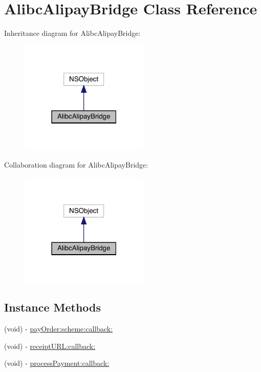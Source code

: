\hypertarget{interface_alibc_alipay_bridge}{}\section{Alibc\+Alipay\+Bridge Class Reference}
\label{interface_alibc_alipay_bridge}


Inheritance diagram for Alibc\+Alipay\+Bridge\+:\nopagebreak
\begin{figure}[H]
\begin{center}
\leavevmode
\includegraphics[width=174pt]{interface_alibc_alipay_bridge__inherit__graph}
\end{center}
\end{figure}


Collaboration diagram for Alibc\+Alipay\+Bridge\+:\nopagebreak
\begin{figure}[H]
\begin{center}
\leavevmode
\includegraphics[width=174pt]{interface_alibc_alipay_bridge__coll__graph}
\end{center}
\end{figure}
\subsection*{Instance Methods}
\begin{DoxyCompactItemize}
\item 
(void) -\/ \mbox{\hyperlink{interface_alibc_alipay_bridge_a91043c94a597d5e0d8f4e1268a21abd2}{pay\+Order\+:scheme\+:callback\+:}}
\item 
(void) -\/ \mbox{\hyperlink{interface_alibc_alipay_bridge_a756c20159c33976347ab4d48cabae60f}{receipt\+U\+R\+L\+:callback\+:}}
\item 
(void) -\/ \mbox{\hyperlink{interface_alibc_alipay_bridge_ab68b0aaa81801cd073f23a1ff72fabda}{process\+Payment\+:callback\+:}}
\end{DoxyCompactItemize}
